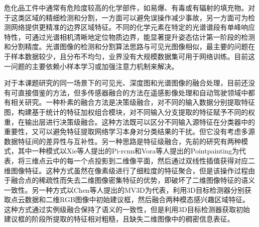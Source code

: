 \documentclass[12pt]{article}
\newcommand{\note}[1]{\textcolor[rgb]{0.6,0,0}{note: #1}}
\begin{document}
危化品工件中通常有危险度较高的化学部件，如易爆、有毒或有辐射的填充物。对于这类区域的精细检测和分割，一方面可以避免误操作减少事故，另一方面可为检测网络提供更精准的边界区域特征。不同的化学元素在特定的光谱谱段有单峰响应特性，可通过光谱相机清晰地定位物质边界，能显著提升姿态估计第一阶段的检测和分割精度。光谱图像的检测和分割算法思路与可见光图像相似，最主要的问题在于样本数据较少，且分布不均匀，业界没有大规模数据集可用于网络训练。目前这一问题的主要依赖小样本学习\cite{lys2022targetDetection, shi2020HyperspectralTargetDetection}或加强注意力机制\cite{shi2020hyperspectralROI}来解决。

对于本课题研究的同一场景下的可见光、深度图和光谱图像的融合处理，目前还没有可直接借鉴的方法，但多传感器融合的方法在遥感影像处理和自动驾驶领域\cite{feng2021}中都有相关研究。一种朴素的融合方法是决策级融合，对不同的输入数据分别提取特征图\cite{pang2020clocs}，构建基于统计的特征加权组合模块，对不同输入分支提取的特征赋予不同的权重，在输出层进行决策级融合\cite{li2022sal}。这种方法既可以区分不同输入源特征在分类器中的重要性，又可以避免特征提取网络学习本身对分类结果的干扰。但它没有考虑多源数据特征间的差异性与互补性。另一种思路是特征级融合，先前的研究有两种模式，其中一种模式以Xie等人提出的Pi-rcnn\cite{xie2020pircnn}和Vora等人提出的Pointpainting\cite{vora2020pointpainting}为代表，将三维点云中的每一个点投影到二维像平面，然后通过双线性插值获得对应二维图像特征。这种方式虽然在像素级进行了细粒度的特征聚合，但是该操作过程由于融合点的稀疏性而失去二维图像密集特征的优势，即破坏了二维图像特征的语义一致性。另一种方式以Chen等人提出的MV3D\cite{chen2017multi}为代表，利用3D目标检测器分别获取点云数据和二维RGB图像中初始建议框，然后融合两种模态感兴趣区域特征。这种方式通过实例级融合保持了语义的一致性，但是利用3D目标检测器获取初始建议框的阶段所提取的特征相对粗糙，且缺失二维图像中的稠密信息表征。

\end{document}
